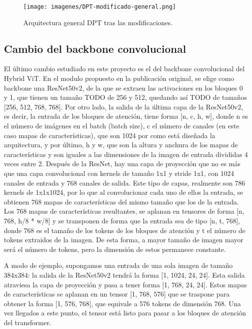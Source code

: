 \begin{figure}[H]
\centering
\texttt{[image: imagenes/DPT-modificado-general.png]}
\caption{Arquitectura general DPT tras las modificaciones.}
\label{fig:dpt-mod-general}
\end{figure}

\subsection{Cambio del backbone convolucional}
El último cambio estudiado en este proyecto es el del backbone convolucional del Hybrid ViT. En el modulo propuesto en la publicación original, se elige como backbone una ResNet50v2, de la que se extraen las activaciones en los bloques 0 y 1, que tienen un tamaño TODO de 256 y 512, quedando así TODO de tamaños [256, 512, 768, 768]. Por otro lado, la salida de la última capa de la ResNet50v2, es decir, la entrada de los bloques de atención, tiene forma [n, c, h, w], donde n es el número de imágenes en el batch (batch size), c el número de canales (en este caso mapas de características), que son 1024 por como está diseñada la arquitectura, y por último, h y w, que son la altura y anchura de los mapas de características y son iguales a las dimensiones de la imagen de entrada divididas 4 veces entre 2. Después de la ResNet, hay una capa de proyección que no es más que una capa convolucional con kernels de tamaño 1x1 y stride 1x1, con 1024 canales de entrada y 768 canales de salida. Este tipo de capas, realmente son 786 kernels de 1x1x1024, por lo que al convolucionar cada uno de ellos la entrada, se obtienen 768 mapas de características del mismo tamaño que los de la entrada. Los 768 mapas de características resultantes, se aplanan en tensores de forma [n, 768, h/8 * w/8] y se transponen de forma que la entrada sea de tipo [n, t, 768], donde 768 es el tamaño de los tokens de los bloques de atención y t el número de tokens extraidos de la imagen. De esta forma, a mayor tamaño de imagen mayor será el número de tokens, pero la dimensión de estos permanece constante.


A modo de ejemplo, supongamos una entrada de una sola imagen de tamaño 384x384: la salida de la ResNet50v2 tendrá la forma [1, 1024, 24, 24]. Esta salida atraviesa la capa de proyección y pasa a tener forma [1, 768, 24, 24]. Estos mapas de características se aplanan en un tensor [1, 768, 576] que se traspone para obtener la forma [1, 576, 768], que equivale a 576 tokens de dimensión 768. Una vez llegados a este punto, el tensor está listo para pasar a los bloques de atención del transformer.


